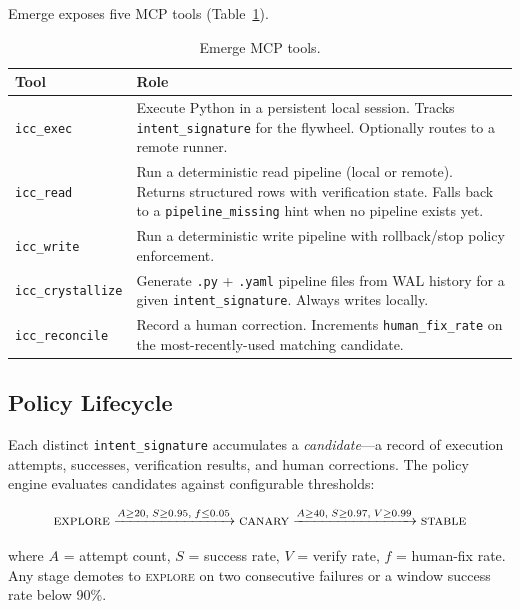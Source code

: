 \documentclass[11pt,a4paper]{article}
\begin{document}
Emerge exposes five MCP tools (Table~\ref{tab:tools}).

\begin{table}[h]
\centering
\caption{Emerge MCP tools.}
\label{tab:tools}
\begin{tabular}{@{}lp{9cm}@{}}
\toprule
\textbf{Tool} & \textbf{Role} \\
\midrule
\texttt{icc\_exec}        & Execute Python in a persistent local session. Tracks \texttt{intent\_signature} for the flywheel. Optionally routes to a remote runner. \\
\texttt{icc\_read}        & Run a deterministic read pipeline (local or remote). Returns structured rows with verification state. Falls back to a \texttt{pipeline\_missing} hint when no pipeline exists yet. \\
\texttt{icc\_write}       & Run a deterministic write pipeline with rollback/stop policy enforcement. \\
\texttt{icc\_crystallize} & Generate \texttt{.py} + \texttt{.yaml} pipeline files from WAL history for a given \texttt{intent\_signature}. Always writes locally. \\
\texttt{icc\_reconcile}   & Record a human correction. Increments \texttt{human\_fix\_rate} on the most-recently-used matching candidate. \\
\bottomrule
\end{tabular}
\end{table}

\subsection{Policy Lifecycle}
\label{sec:lifecycle}

Each distinct \texttt{intent\_signature} accumulates a \emph{candidate}---a record of execution attempts,
successes, verification results, and human corrections.
The policy engine evaluates candidates against configurable thresholds:

\begin{equation}
  \textsc{explore} \xrightarrow{A \geq 20,\; S \geq 0.95,\; f \leq 0.05}
  \textsc{canary} \xrightarrow{A \geq 40,\; S \geq 0.97,\; V \geq 0.99}
  \textsc{stable}
  \label{eq:lifecycle}
\end{equation}

\noindent where $A$ = attempt count, $S$ = success rate, $V$ = verify rate, $f$ = human-fix rate.
Any stage demotes to \textsc{explore} on two consecutive failures or a window success rate below 90\%.
\end{document}
